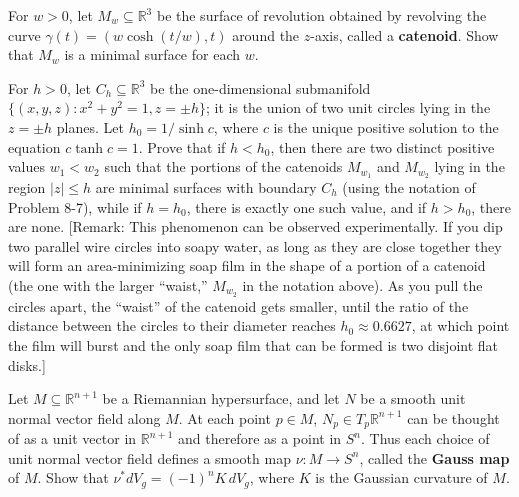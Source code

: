 \begin{exercise}
\label{prob:catenoid-minimal-surface}
For $w > 0$, let $M_w \subseteq \mathbb{R}^3$ be the surface of revolution obtained by revolving the curve $\gamma(t) = (w \cosh(t/w), t)$ around the $z$-axis, called a \textbf{catenoid}. Show that $M_w$ is a minimal surface for each $w$.
\end{exercise}

\begin{exercise}
\label{prob:catenoid-boundary-minimal}
For $h > 0$, let $C_h \subseteq \mathbb{R}^3$ be the one-dimensional submanifold $\{(x, y, z) : x^2 + y^2 = 1, z = \pm h\}$; it is the union of two unit circles lying in the $z = \pm h$ planes. Let $h_0 = 1/\sinh c$, where $c$ is the unique positive solution to the equation $c \tanh c = 1$. Prove that if $h < h_0$, then there are two distinct positive values $w_1 < w_2$ such that the portions of the catenoids $M_{w_1}$ and $M_{w_2}$ lying in the region $|z| \leq h$ are minimal surfaces with boundary $C_h$ (using the notation of Problem 8-7), while if $h = h_0$, there is exactly one such value, and if $h > h_0$, there are none. [Remark: This phenomenon can be observed experimentally. If you dip two parallel wire circles into soapy water, as long as they are close together they will form an area-minimizing soap film in the shape of a portion of a catenoid (the one with the larger ``waist,'' $M_{w_2}$ in the notation above). As you pull the circles apart, the ``waist'' of the catenoid gets smaller, until the ratio of the distance between the circles to their diameter reaches $h_0 \approx 0.6627$, at which point the film will burst and the only soap film that can be formed is two disjoint flat disks.]
\end{exercise}

\begin{exercise}
\label{prob:gauss-map}
Let $M \subseteq \mathbb{R}^{n+1}$ be a Riemannian hypersurface, and let $N$ be a smooth unit normal vector field along $M$. At each point $p \in M$, $N_p \in T_p \mathbb{R}^{n+1}$ can be thought of as a unit vector in $\mathbb{R}^{n+1}$ and therefore as a point in $S^n$. Thus each choice of unit normal vector field defines a smooth map $\nu : M \to S^n$, called the \textbf{Gauss map} of $M$. Show that $\nu^* dV_g = (-1)^n K \, dV_g$, where $K$ is the Gaussian curvature of $M$.
\end{exercise}


